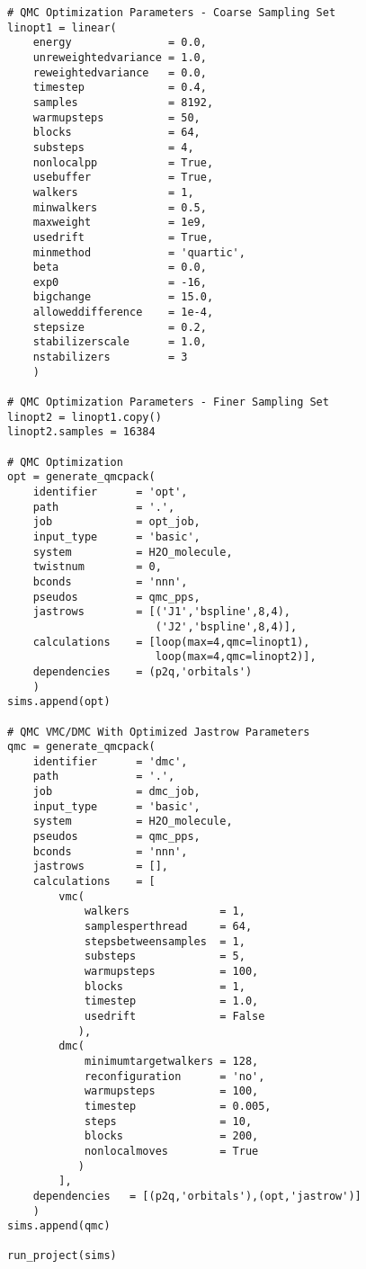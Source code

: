 \begin{lstlisting}[caption=Nexus example for H$_2$O using Quantum ESPRESSO orbitals and BFD pseudopotentials]
# QMC Optimization Parameters - Coarse Sampling Set
linopt1 = linear(
    energy               = 0.0,
    unreweightedvariance = 1.0,
    reweightedvariance   = 0.0,
    timestep             = 0.4,
    samples              = 8192,
    warmupsteps          = 50,
    blocks               = 64,
    substeps             = 4,
    nonlocalpp           = True,
    usebuffer            = True,
    walkers              = 1,
    minwalkers           = 0.5,
    maxweight            = 1e9,
    usedrift             = True,
    minmethod            = 'quartic',
    beta                 = 0.0,
    exp0                 = -16,
    bigchange            = 15.0,
    alloweddifference    = 1e-4,
    stepsize             = 0.2,
    stabilizerscale      = 1.0,
    nstabilizers         = 3
    )

# QMC Optimization Parameters - Finer Sampling Set
linopt2 = linopt1.copy()
linopt2.samples = 16384

# QMC Optimization
opt = generate_qmcpack(
    identifier      = 'opt',
    path            = '.',
    job             = opt_job,
    input_type      = 'basic',
    system          = H2O_molecule,
    twistnum        = 0,
    bconds          = 'nnn',
    pseudos         = qmc_pps,
    jastrows        = [('J1','bspline',8,4),
                       ('J2','bspline',8,4)],
    calculations    = [loop(max=4,qmc=linopt1),
                       loop(max=4,qmc=linopt2)],
    dependencies    = (p2q,'orbitals')
    )
sims.append(opt)

# QMC VMC/DMC With Optimized Jastrow Parameters
qmc = generate_qmcpack(
    identifier      = 'dmc',
    path            = '.',
    job             = dmc_job,
    input_type      = 'basic',
    system          = H2O_molecule,
    pseudos         = qmc_pps,
    bconds          = 'nnn',
    jastrows        = [],
    calculations    = [
        vmc(
            walkers              = 1,
            samplesperthread     = 64,
            stepsbetweensamples  = 1,
            substeps             = 5,
            warmupsteps          = 100,
            blocks               = 1,
            timestep             = 1.0,
            usedrift             = False
           ),
        dmc(
            minimumtargetwalkers = 128,
            reconfiguration      = 'no',
            warmupsteps          = 100,
            timestep             = 0.005,
            steps                = 10,
            blocks               = 200,
            nonlocalmoves        = True
           )
        ],
    dependencies   = [(p2q,'orbitals'),(opt,'jastrow')]
    )
sims.append(qmc)

run_project(sims)

\end{lstlisting}

